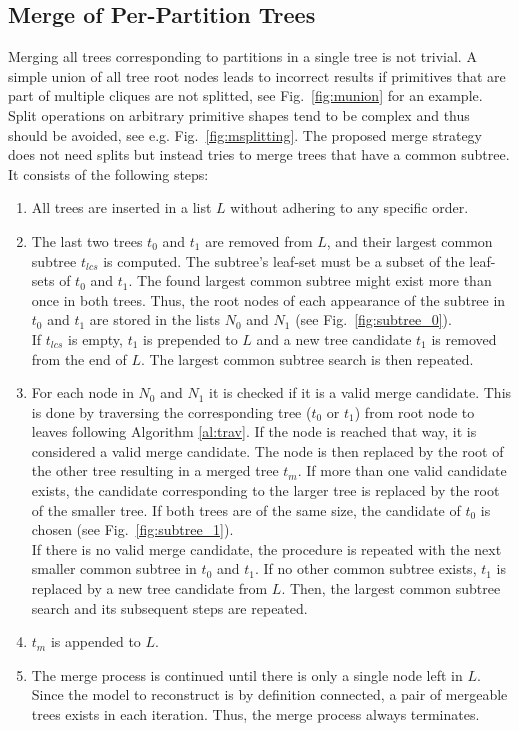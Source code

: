 \subsection{Merge of Per-Partition Trees}
Merging all trees corresponding to partitions in a single tree is not trivial. 
A simple union of all tree root nodes leads to incorrect results if primitives that are part of multiple cliques are not splitted, see Fig.~\ref{fig:munion} for an example.
Split operations on arbitrary primitive shapes tend to be complex and thus should be avoided, see e.g. Fig.~\ref{fig:msplitting}.  
The proposed merge strategy does not need splits but instead tries to merge trees that have a common subtree.
It consists of the following steps:
\begin{enumerate}
	\item All trees are inserted in a list $L$ without adhering to any specific order.   
	\item The last two trees $t_0$ and $t_1$ are removed from $L$, and their largest common subtree $t_{lcs}$ is computed. The subtree's leaf-set must be a subset of the leaf-sets of $t_0$ and $t_1$. 
	The found largest common subtree might exist more than once in both trees.
	Thus, the root nodes of each appearance of the subtree in $t_0$ and $t_1$ are stored in the lists $N_0$ and $N_1$ (see Fig.~\ref{fig:subtree_0}).
	\\	
	If $t_{lcs}$ is empty, $t_1$ is prepended to $L$ and a new tree candidate $t_1$ is removed from the end of $L$. 
	The largest common subtree search is then repeated.
	\item For each node in $N_0$ and $N_1$ it is checked if it is a valid merge candidate.
	This is done by traversing the corresponding tree ($t_0$ or $t_1$) from root node to leaves following Algorithm \ref{al:trav}.
	If the node is reached that way, it is considered a valid merge candidate.
	The node is then replaced by the root of the other tree resulting in a merged tree $t_m$.
	If more than one valid candidate exists, the candidate corresponding to the larger tree is replaced by the root of the smaller tree.
	If both trees are of the same size, the candidate of $t_0$ is chosen (see Fig.~\ref{fig:subtree_1}).
	\\
	If there is no valid merge candidate, the procedure is repeated with the next smaller common subtree in $t_0$ and $t_1$.
	If no other common subtree exists, $t_1$ is replaced by a new tree candidate from $L$.
	Then, the largest common subtree search and its subsequent steps are repeated.
	\item $t_m$ is appended to $L$.
	\item The merge process is continued until there is only a single node left in $L$.
	Since the model to reconstruct is by definition connected, a pair of mergeable trees exists in each iteration. 
	Thus, the merge process always terminates.
\end{enumerate}
